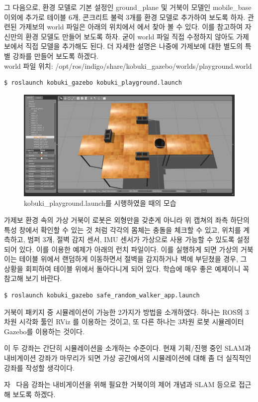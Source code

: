 그 다음으로,  환경 모델로 기본 설정인 ground\_plane 및 거북이 모델인 mobile\_base 이외에 추가로 테이블 6개, 콘크리트 불럭 3개를 환경 모델로 추가하여 보도록 하자. 관련된 가제보의 world 파일은 아래의 위치에서 에서 찾아 볼 수 있다.  이를 참고하여 자신만의 환경 모델도 만들어 보도록 하자. 굳이 world 파일 직접 수정하지 않아도 가제보에서 직접 모델을 추가해도 된다. 더 자세한 설명은 나중에 가제보에 대한 별도의 특별 강좌를 만들어 보도록 하겠다.\\
world 파일 위치: /opt/ros/indigo/share/kobuki\_gazebo/worlds/playground.world

\vspace{\baselineskip}
\begin{lstlisting}[language=ROS]
$ roslaunch kobuki_gazebo kobuki_playground.launch
\end{lstlisting}

\begin{figure}[h]
\centering\includegraphics[width=0.9\columnwidth]{pictures/chapter10/gazebo_kobuki_playground.png}
\caption{kobuki\_playground.launch를 시행하였을 때의 모습}
\end{figure}

가제보 환경 속의 가상 거북이 로봇은 외형만을 갖춘게 아니라 위 캡쳐의 좌측 하단의 특성 창에서 확인할 수 있는 것 처럼 각각의 몸체는 충돌을 체크할 수 있고, 위치를 계측하고, 범퍼 3개, 절벽 감지 센서, IMU 센서가 가상으로 사용 가능할 수 있도록 설정되어 있다. 이를 이용한 예제가 아래의 런치 파일이다. 이를 실행하게 되면 가상의 거북이는 테이블 위에서 랜덤하게 이동하면서 절벽을 감지하거나 벽에 부딛쳤을 경우, 그 상황을 회피하여 테이블 위에서 돌아다니게 되어 있다. 학습에 매우 좋은 예제이니 꼭 참고해 보기 바란다.

\vspace{\baselineskip}
\begin{lstlisting}[language=ROS]
$ roslaunch kobuki_gazebo safe_random_walker_app.launch
\end{lstlisting}

거북이 패키지 중 시뮬레이션이 가능한 2가지가 방법을 소개하였다. 하나는 ROS의 3차원 시각화 툴인 RViz 를 이용하는 것이고, 또 다른 하나는 3차원 로봇 시뮬레이터 Gazebo를 이용하는 것이다. 

이 두 강좌는 간단히 시뮬레이션을 소개하는 수준이다. 현재 기획/진행 중인 SLAM과 내비게이션 강좌가 마무리가 되면 가상 공간에서의 시뮬레이션에 대해 좀 더 실직적인 강좌를 작성할 생각이다. 

자~ 다음 강좌는 내비게이션을 위해 필요한 거북이의 제어 개념과 SLAM 등으로 접근해 보도록 하겠다.

